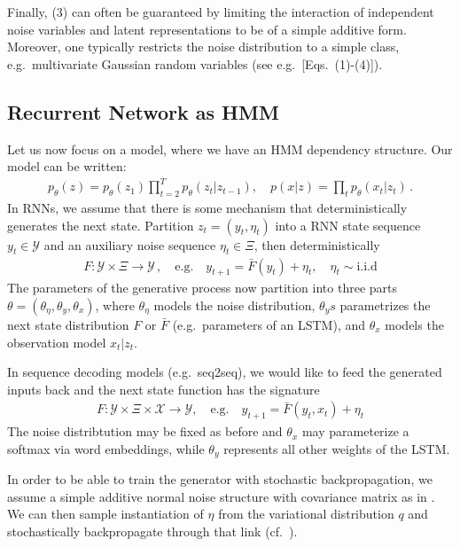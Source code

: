 \documentclass[a4paper,10pt]{article}
\begin{document}
Finally, (3) can often be guaranteed by limiting the interaction of independent noise variables and latent representations to be of a simple additive form. Moreover, one typically restricts the noise distribution to a simple class, e.g.~multivariate Gaussian random variables (see e.g.~[Eqs.~(1)-(4)]\cite{rezende2014stochastic}). 


\subsection{Recurrent Network as HMM} 

Let us now focus on a model, where we have an HMM dependency structure. Our model can be written:
\begin{align}
p_\theta(z) = p_\theta(z_1) \prod_{t=2}^T p_\theta(z_t|z_{t-1}), \quad p(x|z) = \prod_t p_\theta(x_t|z_t)\,.
\end{align}
%
In RNNs, we assume that there is some mechanism that deterministically generates the next state. Partition $z_t = (y_t, \eta_t)$ into a RNN state sequence $y_t \in \mathcal Y$ and an auxiliary noise sequence $\eta_t \in \Xi$, then deterministically 
\begin{align}
F: \mathcal Y \times \Xi \to \mathcal Y\,, \quad \text{e.g.} \quad y_{t+1} = \bar F(y_t) + \eta_t, \quad \eta_t \sim \text{i.i.d}
\end{align}
The parameters of the generative process now partition into three parts $\theta = (\theta_\eta, \theta_y, \theta_x)$, where $\theta_\eta$ models the noise distribution, $\theta_ys$ parametrizes the next state distribution $F$ or $\bar F$ (e.g.~parameters of an LSTM), and $\theta_{x}$ models the observation model $x_t|z_t$. 

In sequence decoding models (e.g.~seq2seq), we would like to feed the generated inputs back and the next state function has the  signature 
\begin{align}
F: \mathcal Y   \times  \Xi \times \mathcal X \to \mathcal Y, \quad \text{e.g.} \quad y_{t+1} = \bar F(y_t,x_t) + \eta_t
\end{align}
The noise distribtution may be fixed as before  and $\theta_x$ may parameterize a softmax via word embeddings, while $\theta_y$ represents all other weights of the LSTM. 

In order to be able to train the generator with stochastic backpropagation, we assume a simple additive normal noise structure with covariance matrix as in \cite{rezende2014stochastic}.  We can then sample instantiation of $\eta$ from the variational distribution $q$ and stochastically backpropagate through that link (cf.~\cite[Figure 1]{rezende2014stochastic}).
\end{document}
